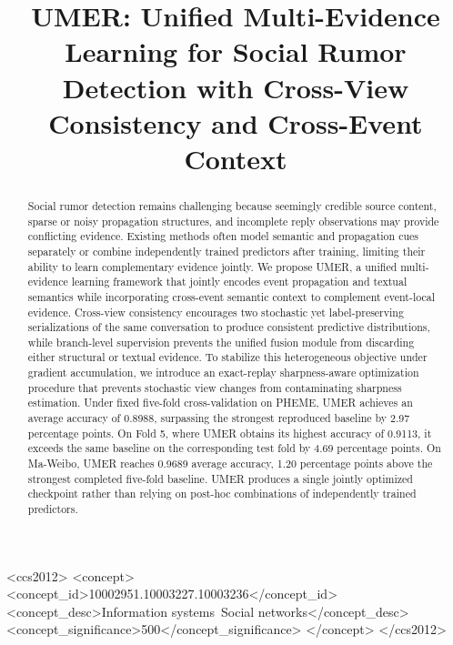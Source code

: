 \documentclass[sigconf,anonymous,review]{../acmart/acmart}
\begin{document}
\title[UMER: Unified Multi-Evidence Learning for Rumor Detection]
{UMER: Unified Multi-Evidence Learning for Social Rumor Detection with
Cross-View Consistency and Cross-Event Context}

\begin{abstract}
Social rumor detection remains challenging because seemingly credible source
content, sparse or noisy propagation structures, and incomplete reply
observations may provide conflicting evidence. Existing methods often model
semantic and propagation cues separately or combine independently trained
predictors after training, limiting their ability to learn complementary
evidence jointly. We propose UMER, a unified multi-evidence learning framework
that jointly encodes event propagation and textual semantics while incorporating
cross-event semantic context to complement event-local evidence. Cross-view
consistency encourages two stochastic yet label-preserving serializations of
the same conversation to produce consistent predictive distributions, while
branch-level supervision prevents the unified fusion module from discarding
either structural or textual evidence. To stabilize this heterogeneous
objective under gradient accumulation, we introduce an exact-replay
sharpness-aware optimization procedure that prevents stochastic view changes
from contaminating sharpness estimation. Under fixed five-fold cross-validation
on PHEME, UMER achieves an average accuracy of 0.8988, surpassing the strongest
reproduced baseline by 2.97 percentage points. On Fold 5, where UMER obtains its
highest accuracy of 0.9113, it exceeds the same baseline on the corresponding
test fold by 4.69 percentage points. On Ma-Weibo, UMER reaches 0.9689 average
accuracy, 1.20 percentage points above the strongest completed five-fold
baseline. UMER produces a single jointly optimized checkpoint rather than
relying on post-hoc combinations of independently trained predictors.
\end{abstract}

\begin{CCSXML}
<ccs2012>
 <concept>
  <concept_id>10002951.10003227.10003236</concept_id>
  <concept_desc>Information systems~Social networks</concept_desc>
  <concept_significance>500</concept_significance>
 </concept>
</ccs2012>
\end{CCSXML}


\end{document}
